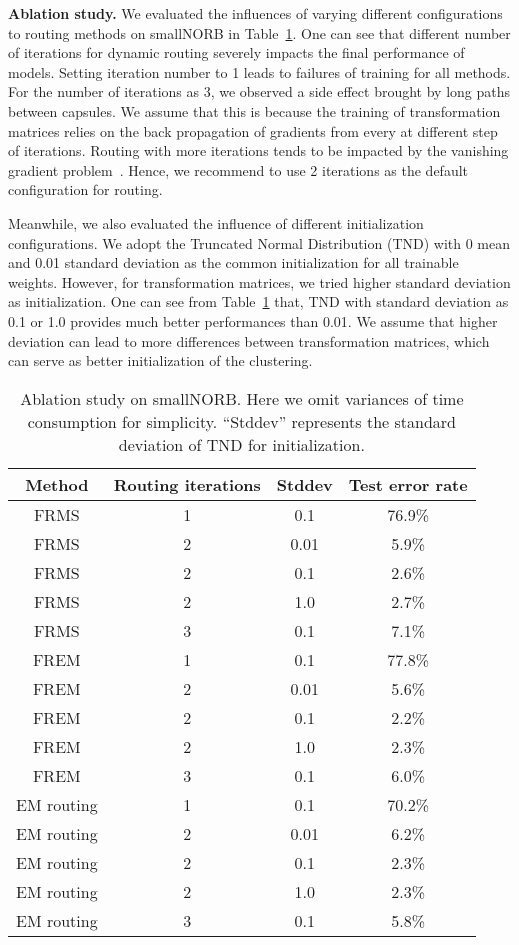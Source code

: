 \documentclass[runningheads]{llncs}
\begin{document}
\textbf{Ablation study.} We evaluated the influences of varying different configurations to routing methods on smallNORB in Table~\ref{tab:ablation}. One can see that different number of iterations for dynamic routing severely impacts the final performance of models. Setting iteration number to 1 leads to failures of training for all methods. For the number of iterations as 3, we observed a side effect brought by long paths between capsules. We assume that this is because the training of transformation matrices relies on the back propagation of gradients from every  at different step of iterations. Routing with more iterations tends to be impacted by the vanishing gradient problem~\cite{he2016deep}. Hence, we recommend to use 2 iterations as the default configuration for routing.

Meanwhile, we also evaluated the influence of different initialization configurations. We adopt the Truncated Normal Distribution (TND) with 0 mean and 0.01 standard deviation as the common initialization for all trainable weights. However, for transformation matrices, we tried higher standard deviation as initialization. One can see from Table~\ref{tab:ablation} that, TND with standard deviation as 0.1 or 1.0 provides much better performances than 0.01. We assume that higher deviation can lead to more differences between transformation matrices, which can serve as better initialization of the clustering.
\begin{table}
\centering
\caption{Ablation study on smallNORB. Here we omit variances of time consumption for simplicity. ``Stddev'' represents the standard deviation of TND for initialization.}
\label{tab:ablation}
\begin{tabular}{cccc}
\toprule
Method & Routing iterations & Stddev & Test error rate \\
\midrule
FRMS & 1 & 0.1 & 76.9\% \\
FRMS & 2 & 0.01 & 5.9\% \\
FRMS & 2 & 0.1 & 2.6\% \\
FRMS & 2 & 1.0 & 2.7\% \\
FRMS & 3 & 0.1 & 7.1\% \\
FREM & 1 & 0.1 & 77.8\% \\
FREM & 2 & 0.01 & 5.6\% \\
FREM & 2 & 0.1 & 2.2\% \\
FREM & 2 & 1.0 & 2.3\% \\
FREM & 3 & 0.1 & 6.0\% \\
EM routing & 1 & 0.1 & 70.2\% \\
EM routing & 2 & 0.01 & 6.2\% \\
EM routing & 2 & 0.1 & 2.3\% \\
EM routing & 2 & 1.0 & 2.3\% \\
EM routing & 3 & 0.1 & 5.8\% \\
\bottomrule
\end{tabular}
\end{table}
\end{document}
